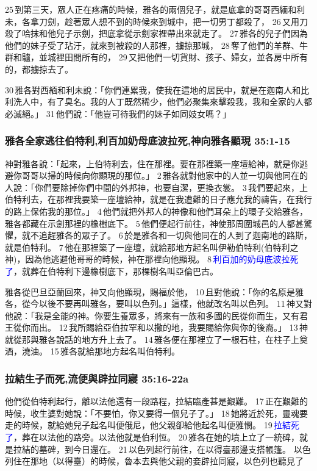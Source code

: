 25 到第三天，眾人正在疼痛的時候，雅各的兩個兒子，就是底拿的哥哥西緬和利未，各拿刀劍，趁著眾人想不到的時候來到城中，把一切男丁都殺了， 26 又用刀殺了哈抹和他兒子示劍，把底拿從示劍家裡帶出來就走了。 27 雅各的兒子們因為他們的妹子受了玷汙，就來到被殺的人那裡，擄掠那城， 28 奪了他們的羊群、牛群和驢，並城裡田間所有的， 29 又把他們一切貨財、孩子、婦女，並各房中所有的，都擄掠去了。

30 雅各對西緬和利未說：「你們連累我，使我在這地的居民中，就是在迦南人和比利洗人中，有了臭名。我的人丁既然稀少，他們必聚集來擊殺我，我和全家的人都必滅絕。」 31 他們說：「他豈可待我們的妹子如同妓女嗎？」



\subsubsection{雅各全家逃往伯特利,利百加奶母底波拉死,神向雅各顯現 35:1-15}
神對雅各說：「起來，上伯特利去，住在那裡。要在那裡築一座壇給神，就是你逃避你哥哥以掃的時候向你顯現的那位。」 2 雅各就對他家中的人並一切與他同在的人說：「你們要除掉你們中間的外邦神，也要自潔，更換衣裳。 3 我們要起來，上伯特利去，在那裡我要築一座壇給神，就是在我遭難的日子應允我的禱告，在我行的路上保佑我的那位。」 4 他們就把外邦人的神像和他們耳朵上的環子交給雅各，雅各都藏在示劍那裡的橡樹底下。 5 他們便起行前往，神使那周圍城邑的人都甚驚懼，就不追趕雅各的眾子了。 6 於是雅各和一切與他同在的人到了迦南地的路斯，就是伯特利。 7 他在那裡築了一座壇，就給那地方起名叫伊勒伯特利(伯特利之神)，因為他逃避他哥哥的時候，神在那裡向他顯現。 8 \textcolor{blue}{利百加的奶母底波拉死了}，就葬在伯特利下邊橡樹底下，那棵樹名叫亞倫巴古。

雅各從巴旦亞蘭回來，神又向他顯現，賜福於他， 10 且對他說：「你的名原是雅各，從今以後不要再叫雅各，要叫以色列。」這樣，他就改名叫以色列。 
11 神又對他說：「我是全能的神。你要生養眾多，將來有一族和多國的民從你而生，又有君王從你而出。 12 我所賜給亞伯拉罕和以撒的地，我要賜給你與你的後裔。」 13 神就從那與雅各說話的地方升上去了。 14 雅各便在那裡立了一根石柱，在柱子上奠酒，澆油。 15 雅各就給那地方起名叫伯特利。


\subsubsection{拉結生子而死,流便與辟拉同寢 35:16-22a}
他們從伯特利起行，離以法他還有一段路程，拉結臨產甚是艱難。 17 正在艱難的時候，收生婆對她說：「不要怕，你又要得一個兒子了。」 18 她將近於死，靈魂要走的時候，就給她兒子起名叫便俄尼，他父親卻給他起名叫便雅憫。 19 \textcolor{blue}{拉結死了}，葬在以法他的路旁。以法他就是伯利恆。 20 雅各在她的墳上立了一統碑，就是拉結的墓碑，到今日還在。 21 以色列起行前往，在以得臺那邊支搭帳篷。
以色列住在那地（以得臺）的時候，魯本去與他父親的妾辟拉同寢，以色列也聽見了

